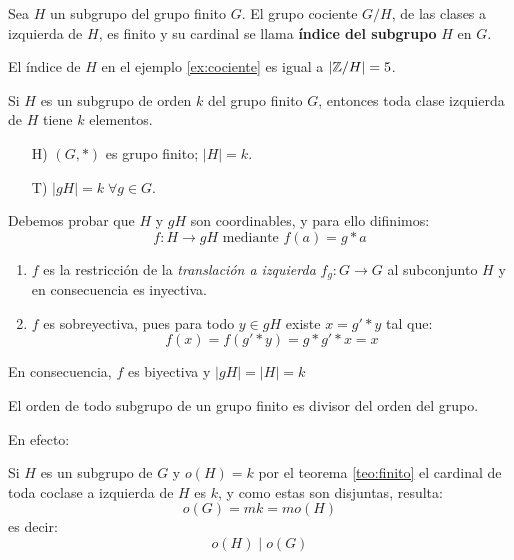 \begin{fmd-definition}
	Sea $H$ un subgrupo del grupo finito $G$. El grupo cociente $G/H$, de las clases a izquierda de $H$, es finito y su cardinal se llama \textbf{índice del subgrupo} $H$ en $G$.
\end{fmd-definition}

El índice de $H$ en el ejemplo \ref{ex:cociente} es igual a $|\mathbb{Z}/H| = 5$.

\begin{fmd-theorem} \label{teo:finito}
Si $H$ es un subgrupo de orden $k$ del grupo finito $G$, entonces toda clase izquierda de $H$ tiene $k$ elementos.

\begin{itemize}
	\item[H)] $(G, *)$ es grupo finito; $|H| = k$.
	\item[T)] $|gH| = k \; \forall g \in G$.
\end{itemize}
\end{fmd-theorem}
\begin{fmd-proof}
	Debemos probar que $H$ y $gH$ son coordinables, y para ello difinimos:
	\[ f: H \rightarrow gH \mbox{ mediante } f(a) = g * a \]
	\begin{enumerate}[label=\roman*)]
		\item $f$ es la restricción de la \textit{translación a izquierda} $f_g: G \rightarrow G$ al subconjunto $H$ y en consecuencia es inyectiva.
		\item $f$ es sobreyectiva, pues para todo $y \in gH$ existe $x = g'*y$ tal que:
		\[ f(x) = f(g' * y) = g * g' * x = x \]
	\end{enumerate}
	En consecuencia, $f$ es biyectiva y $|gH| = |H| = k$
\end{fmd-proof}

\begin{fmd-theorem}[Lagrange] \label{teo:Lagrange}
	El orden de todo subgrupo de un grupo finito es divisor del orden del grupo.
\end{fmd-theorem}

\begin{fmd-proof} En efecto:
	
	Si $H$ es un subgrupo  de $G$ y $o(H) = k$ por el teorema \ref{teo:finito} el cardinal de toda coclase a izquierda de $H$ es $k$, y como estas son disjuntas, resulta:
	\[ o(G) = mk = m o(H) \]
	es decir:
	\[ o(H) \mid o(G) \]
\end{fmd-proof}



